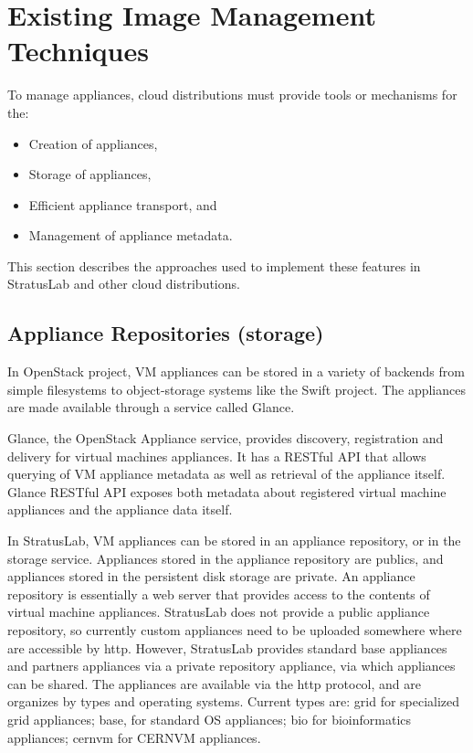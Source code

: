 \section{Existing Image Management Techniques}
\label{sec:other-approaches}

To manage appliances, cloud distributions must provide tools or
mechanisms for the:
\begin{itemize}
\item Creation of appliances,
\item Storage of appliances,
\item Efficient appliance transport, and
\item Management of appliance metadata.
\end{itemize}
This section describes the approaches used to implement these features
in StratusLab and other cloud distributions.

\subsection{Appliance Repositories (storage)}

In OpenStack project, VM appliances can be stored in a variety of
backends from simple filesystems to object-storage systems like the
Swift project. The appliances are made available through a service
called Glance.

Glance, the OpenStack Appliance service, provides discovery,
registration and delivery for virtual machines appliances. It has a
RESTful API that allows querying of VM appliance metadata as well as
retrieval of the appliance itself.  Glance RESTful API exposes both
metadata about registered virtual machine appliances and the appliance
data itself.

In StratusLab, VM appliances can be stored in an appliance repository,
or in the storage service. Appliances stored in the appliance
repository are publics, and appliances stored in the persistent disk
storage are private.  An appliance repository is essentially a web
server that provides access to the contents of virtual machine
appliances. StratusLab does not provide a public appliance repository,
so currently custom appliances need to be uploaded somewhere where are
accessible by http. However, StratusLab provides standard base
appliances and partners appliances via a private repository appliance,
via which appliances can be shared. The appliances are available via
the http protocol, and are organizes by types and operating systems.
Current types are: grid for specialized grid appliances; base, for
standard OS appliances; bio for bioinformatics appliances; cernvm for
CERNVM appliances.

